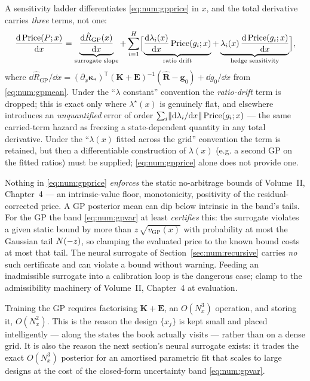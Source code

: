 \begin{remark}
\label{rem:num:gpderiv}
A sensitivity ladder differentiates \eqref{eq:num:gpprice} in $x$, and the total
derivative carries \emph{three} terms, not one:
\[
   \frac{\mathrm{d}\,\mathrm{Price}(P;x)}{\mathrm{d} x}
   = \underbrace{\frac{\mathrm{d} \hat R_{\mathrm{GP}}(x)}{\mathrm{d} x}}_{\text{surrogate slope}}
   + \sum_{i=1}^{H}\Bigl[
       \underbrace{\frac{\mathrm{d} \lambda_i(x)}{\mathrm{d} x}\,\mathrm{Price}(g_i;x)}_{\text{ratio drift}}
     + \underbrace{\lambda_i(x)\,\frac{\mathrm{d}\,\mathrm{Price}(g_i;x)}{\mathrm{d} x}}_{\text{hedge sensitivity}}\Bigr],
\]
where $\dd\hat R_{\mathrm{GP}}/\dd x = (\partial_x\boldsymbol{\kappa}_\ast)^{\mathsf T}
(\mathbf K+\mathbf E)^{-1}(\hat{\mathbf R}-\mathbf g_0) + \dd g_0/\dd x$ from
\eqref{eq:num:gpmean}. Under the ``$\lambda$ constant'' convention the
\emph{ratio-drift} term is dropped; this is exact only where $\lambda^\star(x)$ is
genuinely flat, and elsewhere introduces an \emph{unquantified} error of order
$\sum_i \lVert\mathrm{d}\lambda_i/\mathrm{d} x\rVert\,\mathrm{Price}(g_i;x)$ --- the same
carried-term hazard as freezing a state-dependent quantity in any total
derivative. Under the ``$\lambda(x)$ fitted across the grid'' convention the term
is retained, but then a differentiable construction of $\lambda(x)$ (e.g. a second
GP on the fitted ratios) must be supplied; \eqref{eq:num:gpprice} alone does not
provide one.
\end{remark}

\begin{remark}\label{rem:num:admissible}
Nothing in \eqref{eq:num:gpprice} \emph{enforces} the static no-arbitrage bounds
of Volume~II, Chapter~4 --- an intrinsic-value floor, monotonicity, positivity of
the residual-corrected price. A GP posterior mean can dip below intrinsic in the
band's tails. For the GP the band \eqref{eq:num:gpvar} at least \emph{certifies}
this: the surrogate violates a given static bound by more than
$z\,\sqrt{v_{\mathrm{GP}}(x)}$ with probability at most the Gaussian tail
$N(-z)$, so clamping the evaluated price to the known bound costs at most that
tail. The neural surrogate of Section~\ref{sec:num:recursive} carries \emph{no}
such certificate and can violate a bound without warning. Feeding an inadmissible
surrogate into a calibration loop is the dangerous case; clamp to the
admissibility machinery of Volume~II, Chapter~4 at evaluation.
\end{remark}

\begin{remark}\label{rem:num:cost}
Training the GP requires factorising $\mathbf K + \mathbf E$, an $O(N_{x}^3)$
operation, and storing it, $O(N_{x}^2)$. This is the reason the design $\{x_j\}$ is
kept small and placed intelligently --- along the states the book actually
visits --- rather than on a dense grid. It is also the reason the next section's
neural surrogate exists: it trades the exact $O(N_{x}^3)$ posterior for an
amortised parametric fit that scales to large designs at the cost of the
closed-form uncertainty band \eqref{eq:num:gpvar}.
\end{remark}

